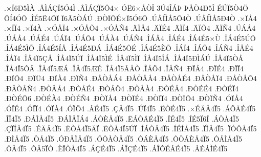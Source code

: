 {.^^d7^^cf6^^d05^^cc^^c0
.^^c2^^cc^^c1^^c7^^cf5^^d34^^cc
.^^c2^^cc^^c1^^c7^^cf5^^d44^^d7
^^d3^^cb6^^d7^^c5^^d2^^ce
3^^da4^^ce^^c1^^de
^^de^^c5^^d24^^d05^^ce
^^c9^^da^^cf5^^d24^^d6
^^d4^^cd4^^d3^^d4
.^^ce^^c95^^cb4^^d4^^cf
^^cf6^^c25^^d2^^c1^^da
.^^d0^^d2^^cf^^d4^^c9^^d7^^cf5^^d36^^d4
.^^da^^c5^^cd^^cc^^c55^^d44^^d2
.^^da^^c5^^cd^^cc^^c55^^d04^^d2
.^^d7^^cf^^c54
.^^d7^^cf^^cf4
.^^d7^^cf4^^c0
.^^d7^^d3^^c5^^cf4
.^^d7^^d3^^c5^^d54
.^^d7^^d3^^c5^^d14
.^^c4^^cf^^c54
.^^c4^^cf^^c94
.^^c4^^cf^^cf4
.^^c4^^cf^^d54
.^^c4^^cf^^d14
.^^da^^c1^^c14
.^^da^^c1^^c54
.^^da^^c1^^c94
.^^da^^c1^^cf4
.^^da^^c1^^d54
.^^da^^c1^^c04
.^^da^^c1^^d14
.^^ce^^c1^^c54
.^^ce^^c1^^c94
.^^ce^^c14^^c95^^d7^^d9
.^^ce^^c14^^c95^^da^^d5
.^^ce^^c14^^c95^^cc^^d5
.^^ce^^c14^^c95^^cd^^c5
.^^ce^^c14^^c95^^d0^^c1
.^^ce^^c14^^c95^^d4^^c9
.^^ce^^c14^^c95^^c8^^d5
.^^ce^^c1^^cf4
.^^ce^^c1^^d54
.^^ce^^c1^^d14
.^^ce^^c5^^c94
.^^ce^^c5^^cf4
.^^ce^^c54^^cf5^^c7^^c5
.^^ce^^c54^^cf5^^da^^cf
.^^ce^^c54^^cf5^^cc^^c9
.^^ce^^c54^^cf5^^cc^^cf
.^^ce^^c54^^cf5^^ce^^c1
.^^ce^^c54^^cf5^^d0^^cc^^c1^^da
.^^ce^^c54^^cf5^^d2^^c5
.^^ce^^c54^^cf5^^d4^^c5
.^^ce^^c54^^cf5^^c6^^c1
.^^ce^^c54^^cf5^^c6^^c9
.^^ce^^c54^^cf5^^c3^^c5^^d2
.^^ce^^c5^^d54
.^^ce^^c5^^d14
.^^d0^^cf^^c54
.^^d0^^cf^^c94
.^^d0^^cf^^cf4
.^^d0^^cf^^d54
.^^d0^^cf^^dc4
.^^d0^^cf^^c04
.^^d0^^cf^^d14
.^^d0^^c5^^d2^^c5^^c14
.^^d0^^c5^^d2^^c5^^c54
.^^d0^^c5^^d2^^c5^^c94
.^^d0^^c5^^d2^^c5^^cf4
.^^d0^^c5^^d2^^c5^^d54
.^^d0^^c5^^d2^^c5^^d14
.^^d0^^d2^^c5^^c54
.^^d0^^d2^^c5^^c94
.^^d0^^d2^^c5^^d54
.^^d0^^d2^^c5^^c04
.^^d0^^d2^^c9^^c54
.^^d0^^d2^^c9^^c94
.^^d0^^d2^^c9^^cf4
.^^d0^^d2^^c9^^d56
.^^d0^^d2^^c9^^c04
.^^d0^^d2^^c9^^d14
.^^d0^^d2^^cf^^c54
.^^d0^^d2^^cf^^c94
.^^d0^^d2^^cf^^cf4
.^^d0^^d2^^cf^^d54
.^^d0^^d2^^cf^^d14
.^^d3^^cf^^c54
.^^d3^^cf^^c94
.^^d3^^cf^^cf4
.^^d3^^cf^^c04
.^^d3^^cf^^d54
.^^c2^^c94^^cf5
.^^c7^^c54^^cf5
.^^da^^cf4^^cf5
.^^cb^^d2^^c94^^cf5
.^^d7^^c9^^c4^^c54^^cf5
.^^c1^^d5^^c4^^c94^^cf5
.^^ce^^cf4^^cf5
.^^d0^^c1^^cc^^c54^^cf5
.^^d0^^c1^^cc^^c5^^cf^^c14
.^^c1^^d2^^c8^^c54^^cf5
.^^cb^^c1^^d2^^c4^^c94^^cf5
.^^cd^^c94^^cf5
.^^cd^^c95^^cf6^^cd
.^^c1^^d2^^c54^^cf5
.^^c7^^cf^^cd^^c54^^cf5
.^^c9^^c4^^c54^^cf5
.^^cb^^d2^^c54^^cf5^^c4^^cf
.^^cb^^d2^^c54^^cf5^^da^^cf
.^^cd^^c1^^d2^^c54^^cf5
.^^cd^^c9^^cd^^c54^^cf5
.^^cf^^cc^^c54^^cf5
.^^cf^^d3^^d4^^c54^^cf5
.^^d0^^cc^^c54^^cf5
.^^d2^^c54^^cf5
.^^d3^^d0^^c5^^cc^^c54^^cf5
.^^d3^^d4^^c5^^d2^^c54^^cf5
.^^d4^^c1^^c8^^c54^^cf5
.^^d4^^d2^^c1^^c8^^c54^^cf5
.^^d4^^c5^^cc^^c54^^cf5
.^^d4^^c54^^cf5
.^^d4^^c55^^cf^^d2
.^^c8^^cf^^d2^^c54^^cf5
.^^c1^^c7^^c94^^cf5
.^^c1^^ce^^c7^^c94^^cf5
.^^c1^^ce^^d4^^c9^^c2^^c94^^cf5
.^^c2^^c9^^c2^^cc^^c94^^cf5
}
